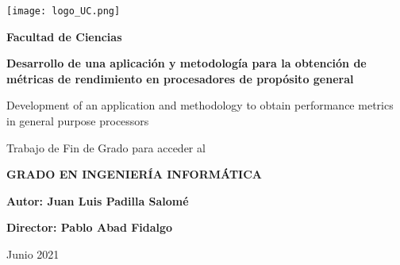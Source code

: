 
\begin{titlepage}
    \begin{center}
        \vspace*{1cm}
 
        \texttt{[image: logo\_UC.png]}

        \vspace{1.0cm}

        \Large
        \textbf{Facultad de Ciencias}

        \vspace{1.0cm}

        \LARGE
        \textbf{Desarrollo de una aplicaci\'on y metodolog\'ia para la obtenci\'on de m\'etricas de rendimiento en procesadores de prop\'osito general}
 
        \vspace{0.3cm}

        \Large
        Development of an application and methodology to obtain performance metrics in general purpose processors

        \vspace{1.5cm}

        \large
        Trabajo de Fin de Grado para acceder al

        \vspace{0.8cm}

        \Large
        \textbf{GRADO EN INGENIERÍA INFORMÁTICA}
 
        \vfill

        \large
        \begin{flushright}
            \textbf{Autor: Juan Luis Padilla Salomé}

            \vspace{0.4cm}

            \textbf{Director: Pablo Abad Fidalgo}

            \vspace{0.6cm}

            Junio 2021
        \end{flushright}
             
    \end{center}
 \end{titlepage}